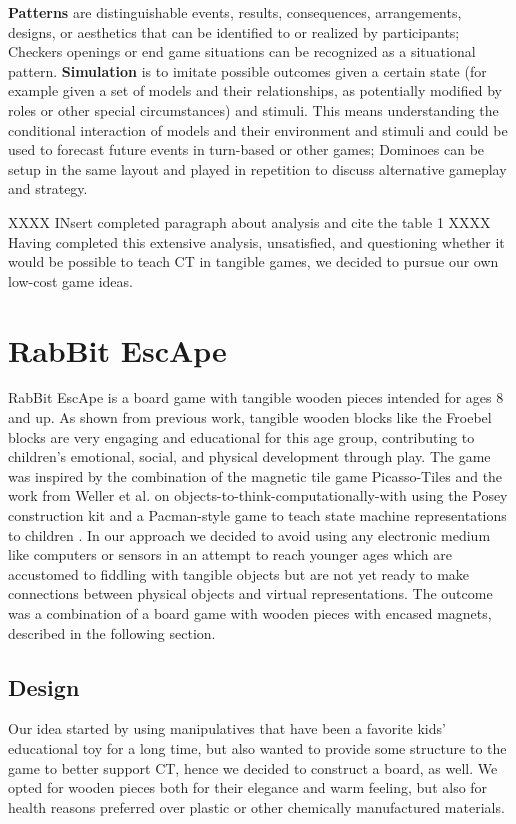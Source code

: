 \documentclass{acm_proc_article-sp}
\begin{document}
\textbf{Patterns} are distinguishable events, results, consequences, arrangements, designs, or aesthetics that can be identified to or realized by participants; Checkers openings or end game situations can be recognized as a situational pattern.
\textbf{Simulation} is to imitate possible outcomes given a certain state (for example given a set of models and their relationships, as potentially modified by roles or other special circumstances) and stimuli.
This means understanding the conditional interaction of models and their environment and stimuli and could be used to forecast future events in turn-based or other games; Dominoes can be setup in the same layout and played in repetition to discuss alternative gameplay and strategy.

XXXX INsert completed paragraph about analysis and cite the table 1 XXXX
Having completed this extensive analysis, unsatisfied, and questioning whether it would be possible to teach CT in tangible games, we decided to pursue our own low-cost game ideas.

\section{RabBit EscApe}
\label{sec:rabbit}
RabBit EscApe is a board game with tangible wooden pieces intended for ages 8 and up.
As shown from previous work, tangible wooden blocks like the Froebel blocks \cite{liebschner1992child} are very engaging and educational for this age group, contributing to children's emotional, social, and physical development through play.
The game was inspired by the combination of the magnetic tile game Picasso-Tiles \cite{picassotiles3d} and the work from Weller et al. on objects-to-think-computationally-with using the Posey construction kit and a Pacman-style game to teach state machine representations to children \cite{weller2008escape}.
In our approach we decided to avoid using any electronic medium like computers or sensors in an attempt to reach younger ages which are accustomed to fiddling with tangible objects but are not yet ready to make connections between physical objects and virtual representations.
The outcome was a combination of a board game with wooden pieces with encased magnets, described in the following section.

\subsection{Design}
\label{sec:design}
Our idea started by using manipulatives that have been a favorite kids' educational toy for a long time, but also wanted to provide some structure to the game to better support CT, hence we decided to construct a board, as well.
We opted for wooden pieces both for their elegance and warm feeling, but also for health reasons preferred over plastic or other chemically manufactured materials. 
\end{document}
